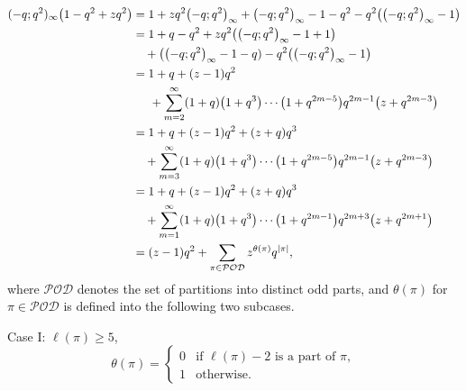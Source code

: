 \documentclass[pdftex]{sigma}
\numberwithin{equation}{section}
\begin{document}
\begin{align*}
(-q;q^2)_{\infty}\bigl(1-q^2+zq^2\bigr)&=1+zq^2\bigl(-q;q^2\bigr)_{\infty}+\bigl(-q;q^2\bigr)_{\infty}-1-q^2-q^2\bigl(\bigl(-q;q^2\bigr)_{\infty}-1\bigr)
\\
&=1+q-q^2+zq^2\bigl(\bigl(-q;q^2\bigr)_{\infty}-1+1\bigr)
\\
&\quad+\bigl(\bigl(-q;q^2\bigr)_{\infty}-1-q)-q^2\bigl(\bigl(-q;q^2\bigr)_{\infty}-1\bigr)
\\
&=1+q+(z-1)q^2
\\
&\hspace{5mm}+\sum\limits_{m=2}^{\infty}(1+q)\bigl(1+q^3\bigr)\cdots\bigl(1+q^{2m-5}\bigr)q^{2m-1}\bigl(z+q^{2m-3}\bigr)
\\
&=1+q+(z-1)q^2+(z+q)q^3
\\
&\quad+\sum\limits_{m=3}^{\infty}(1+q)\bigl(1+q^3\bigr)\cdots\bigl(1+q^{2m-5}\bigr)q^{2m-1}\bigl(z+q^{2m-3}\bigr)
\\
&=1+q+(z-1)q^2+(z+q)q^3
\\
&\quad+\sum\limits_{m=1}^{\infty}(1+q)\bigl(1+q^3\bigr)\cdots\bigl(1+q^{2m-1}\bigr)q^{2m+3}\bigl(z+q^{2m+1}\bigr)
\\
&=(z-1)q^2+\sum\limits_{\pi \in \mathcal{POD}}z^{\theta(\pi)}q^{|\pi|},
\end{align*}
where $\mathcal{POD}$ denotes the set of partitions into distinct odd parts, and $\theta(\pi)$ for $\pi \in \mathcal{POD}$  is defined into the following two subcases.

Case I: $\ell(\pi) \geq 5$,
\begin{equation*}%
\theta(\pi)=\begin{cases}
0 & \mbox{if $\ell(\pi)-2$ is a part of $\pi$}, \\
1 & \mbox{otherwise.}
\end{cases}
\end{equation*}%
\end{document}
